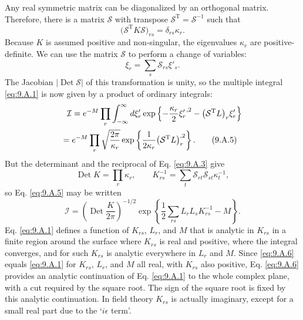 Any real symmetric matrix can be diagonalized by an orthogonal matrix.
Therefore, there is a matrix $\mathcal{S}$ with transpose
$\mathcal{S}^{\mathrm T}=\mathcal{S}^{-1}$ such that
\begin{equation}
  \bigl(\mathcal{S}^{\mathrm T}K\mathcal{S}\bigr)_{rs}
  =\delta_{rs}\kappa_r.
  \tag{9.A.3}\label{eq:9.A.3}
\end{equation}
Because $K$ is assumed positive and non-singular, the eigenvalues $\kappa_r$
are positive-definite. We can use the matrix $\mathcal{S}$ to perform a
change of variables:
\begin{equation}
  \xi_r=\sum_s\mathcal{S}_{rs}\xi'_s.
  \tag{9.A.4}\label{eq:9.A.4}
\end{equation}
The Jacobian $|\operatorname{Det}\mathcal{S}|$ of this transformation is
unity, so the multiple integral \eqref{eq:9.A.1} is now given by a product of
ordinary integrals:
\begin{align}
  \mathcal{I}
  &={}e^{-M}\prod_r\int_{-\infty}^{\infty}d\xi'_r
  \exp\left\{-\frac{\kappa_r}{2}{\xi'_r}^{,2}
  -\bigl(\mathcal{S}^{\mathrm T}L\bigr)_r\xi'_r\right\}
  \notag\\
  ={}&e^{-M}\prod_r\sqrt{\frac{2\pi}{\kappa_r}}
  \exp\left\{\frac{1}{2\kappa_r}
  \bigl(\mathcal{S}^{\mathrm T}L\bigr)_r^{,2}\right\}.
  \tag{9.A.5}\label{eq:9.A.5}
\end{align}
But the determinant and the reciprocal of Eq. \eqref{eq:9.A.3} give
\[
  \operatorname{Det}K=\prod_r\kappa_r,
  \qquad
  K^{-1}_{rs}=\sum_t\mathcal{S}_{rt}\mathcal{S}_{st}\kappa_t^{-1},
\]
so Eq. \eqref{eq:9.A.5} may be written
\begin{equation}
  \mathcal{I}=\left(\operatorname{Det}\frac{K}{2\pi}\right)^{-1/2}
  \exp\left\{\frac{1}{2}\sum_{rs}L_rL_sK^{-1}_{rs}-M\right\}.
  \tag{9.A.6}\label{eq:9.A.6}
\end{equation}
Eq. \eqref{eq:9.A.1} defines a function of $K_{rs}$, $L_r$, and $M$ that is analytic
in $K_{rs}$ in a finite region around the surface where $K_{rs}$ is real and
positive, where the integral converges, and for such $K_{rs}$ is analytic
everywhere in $L_r$ and $M$. Since \eqref{eq:9.A.6} equals \eqref{eq:9.A.1} for $K_{rs}$,
$L_r$, and $M$ all real, with $K_{rs}$ also positive, Eq. \eqref{eq:9.A.6} provides
an analytic continuation of Eq. \eqref{eq:9.A.1} to the whole complex plane, with a
cut required by the square root. The sign of the square root is fixed by this
analytic continuation. In field theory $K_{rs}$ is actually imaginary,
except for a small real part due to the `$i\epsilon$ term'.

